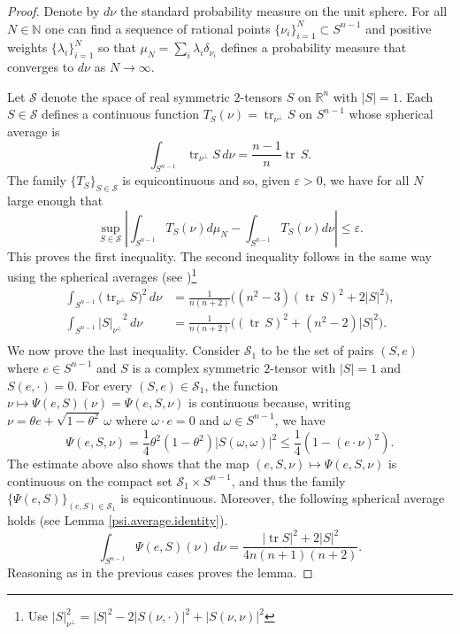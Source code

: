 \documentclass[11pt]{amsart}
\def\N{\mathbb N}
\def\tr{\operatorname{tr}}
\theoremstyle{remark}
\theoremstyle{definition}
\begin{document}
	\begin{proof}
		Denote by $d\nu$  the standard probability measure on the unit sphere.  For all $N\in \N$ one can find a sequence of rational points $\{\nu_i\}_{i=1}^N\subset S^{n-1}$ and positive weights $\{\lambda_i\}_{i=1}^N$ so that $\mu_N=\sum_{i}\lambda_i\delta_{\nu_i}$ defines a probability measure that converges to $d\nu$ as $N\to\infty$.
		
		Let $\mathcal S$ denote the space of real symmetric $2$-tensors $S$ on $\mathbb R^n$ with $|S|=1$. Each $S\in \mathcal S$ defines a continuous function $T_S(\nu)=\tr_{\nu^{\bot}}S$ on $S^{n-1}$ whose spherical average is 
		$$\int_{S^{n-1}}\tr_{\nu^{\bot}}S\,d\nu = \frac{n-1}{n} \tr\, S.$$
		The family $\{T_S\}_{S\in\mathcal S}$ is equicontinuous and so, given $\varepsilon>0$, we have for all  $N$ large enough that
		$$\sup_{S\in\mathcal S}\left|\int_{S^{n-1}}T_S(\nu)d\mu_N-\int_{S^{n-1}}T_S(\nu)d\nu\right|\leq \varepsilon.$$
		This proves the first inequality. The second inequality follows in the same way using  the spherical averages {(see \cite[Theorem~2.4]{bodmann-ehler-graf})\footnote{{Use $|S|_{\nu^{\bot}}^2=|S|^2-2|S(\nu,\cdot)|^2+|S(\nu,\nu)|^2$}}}
		\begin{align*}
			\int_{S^{n-1}}\bigl(\tr_{\nu^{\bot}}S\bigr)^2\,d\nu
			&=\frac1{n(n+2)}\bigl((n^2-3)(\tr\, S)^2+2|S|^2\bigr),\\
			\int_{S^{n-1}}{|S|_{\nu^{\bot}}}^2\,d\nu
			&=\frac1{n(n+2)}\bigl((\tr\, S)^2+(n^2-2)|S|^2\bigr).\\
		\end{align*}
		We now prove the last inequality. Consider $\mathcal S_1$ to be the set of pairs $(S,e)$ where $e\in S^{n-1}$ and $S$ is a complex symmetric $2$-tensor with $|S|=1$ and $S(e,\cdot)=0$.
		For every $(S,e)\in \mathcal S_1$, the function $\nu\mapsto\Psi(e,S)(\nu)=\Psi(e,S,\nu)$ is continuous because, writing  $\nu=\theta e+\sqrt{1-\theta^2}\,\omega$ where $\omega\cdot e=0$  and $\omega\in S^{n-1}$, we have
		\begin{equation}\label{integration.grassmanian}
			\Psi(e,S,\nu)=\frac14\theta^2(1-\theta^2)|S(\omega,\omega)|^2\leq \frac14(1-(e\cdot\nu)^2).
		\end{equation}
		The estimate above also shows that the map $(e,S,\nu)\mapsto\Psi(e,S,\nu)$ is continuous on the compact set $\mathcal S_1\times S^{n-1}$, and thus the family $\{\Psi(e,S)\}_{(e,S)\in\mathcal S_1}$ is equicontinuous. Moreover, the following spherical average holds (see Lemma \ref{psi.average.identity}).
		$$
		\int_{S^{n-1}}\Psi(e,S)(\nu)\,d\nu=\frac{|\tr S|^2+2|S|^2}{4n(n+1)(n+2)}.
		$$
		Reasoning as in the previous cases proves the lemma.
	\end{proof}
	
\end{document}
